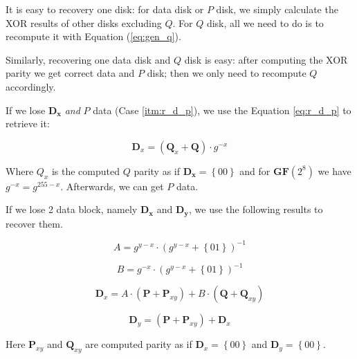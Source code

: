 It is easy to recovery one disk: for data disk or $P$ disk, we simply calculate the XOR results of other disks excluding $Q$. For $Q$ disk, all we need to do is to recompute it with Equation (\ref{eq:gen_q}).

Similarly, recovering one data disk and $Q$ disk is easy: after computing the XOR parity we get correct data and $P$ disk; then we only need to recompute $Q$ accordingly.

If we lose $\mathbf{D_x}$ \emph{and} $P$ data (Case \ref{itm:r_d_p}), we use the Equation \ref{eq:r_d_p} to retrieve it:

\begin{equation}\label{eq:r_d_p}
	\mathbf{D}_x = (\mathbf{Q}_x+\mathbf{Q})\cdot g^{-x}
\end{equation}

Where $\mathbf{}Q_x$ is the computed $Q$ parity as if $\mathbf{D_x}=\left\{00\right\}$ and for $\mathbf{GF}(2^8)$ we have $g^{-x}=g^{255-x}$. Afterwards, we can get $P$ data.

If we lose 2 data block, namely $\mathbf{D_x}$ and $\mathbf{D_y}$, we use the following results to recover them.

\begin{equation}
	A = g^{y-x}\cdot (g^{y-x}+\left\{01\right\})^{-1}
\end{equation}

\begin{equation}
	B = g^{-x}\cdot(g^{y-x}+\left\{01\right\})^{-1}
\end{equation}

\begin{equation}
	\mathbf{D}_{x} = A\cdot (\mathbf{P}+\mathbf{P}_{xy}) + B\cdot (\mathbf{Q}+\mathbf{Q}_{xy})
\end{equation}

\begin{equation}
	\mathbf{D}_{y} = (\mathbf{P}+\mathbf{P}_{xy}) + \mathbf{D}_x
\end{equation}

Here $\mathbf{P}_{xy}$ and $\mathbf{Q}_{xy}$ are computed parity as if $\mathbf{D}_x=\left\{00\right\}$ and $\mathbf{D}_y=\left\{00\right\}$.





